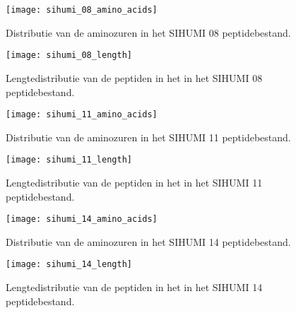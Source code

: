 \begin{figure}[H]
    \centering
    \texttt{[image: sihumi\_08\_amino\_acids]}
    \caption{Distributie van de aminozuren in het SIHUMI 08 peptidebestand.}
    \label{fig:sihumi_08_amino_acids}
\end{figure}

\begin{figure}[H]
    \centering
    \texttt{[image: sihumi\_08\_length]}
    \caption{Lengtedistributie van de peptiden in het in het SIHUMI 08 peptidebestand.}
    \label{fig:sihumi_08_distr}
\end{figure}

\begin{figure}[H]
    \centering
    \texttt{[image: sihumi\_11\_amino\_acids]}
    \caption{Distributie van de aminozuren in het SIHUMI 11 peptidebestand.}
    \label{fig:sihumi_11_amino_acids}
\end{figure}

\begin{figure}[H]
    \centering
    \texttt{[image: sihumi\_11\_length]}
    \caption{Lengtedistributie van de peptiden in het in het SIHUMI 11 peptidebestand.}
    \label{fig:sihumi_11_distr}
\end{figure}

\begin{figure}[H]
    \centering
    \texttt{[image: sihumi\_14\_amino\_acids]}
    \caption{Distributie van de aminozuren in het SIHUMI 14 peptidebestand.}
    \label{fig:sihumi_14_amino_acids}
\end{figure}

\begin{figure}[H]
    \centering
    \texttt{[image: sihumi\_14\_length]}
    \caption{Lengtedistributie van de peptiden in het in het SIHUMI 14 peptidebestand.}
    \label{fig:sihumi_14_distr}
\end{figure}